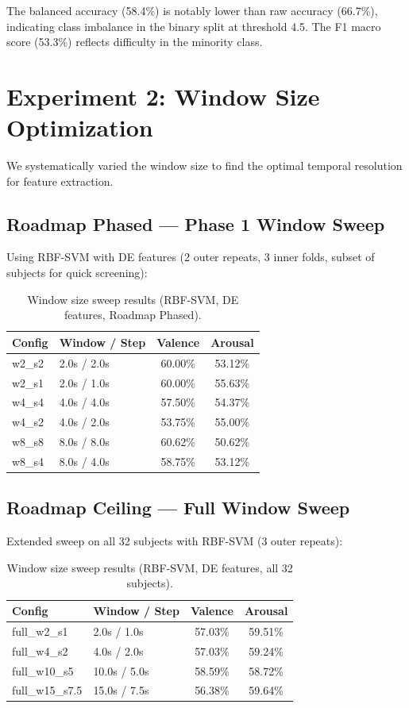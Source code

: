 \documentclass[12pt,a4paper]{report}
\begin{document}
The balanced accuracy (58.4\%) is notably lower than raw accuracy (66.7\%),
indicating class imbalance in the binary split at threshold 4.5. The F1
macro score (53.3\%) reflects difficulty in the minority class.


\section{Experiment 2: Window Size Optimization}
\label{sec:exp_window}

We systematically varied the window size to find the optimal temporal
resolution for feature extraction.

\subsection{Roadmap Phased --- Phase 1 Window Sweep}

Using RBF-SVM with DE features (2 outer repeats, 3 inner folds, subset of
subjects for quick screening):

\begin{table}[H]
\centering
\caption{Window size sweep results (RBF-SVM, DE features, Roadmap Phased).}
\label{tab:window_sweep_phased}
\begin{tabular}{llcc}
\toprule
\textbf{Config} & \textbf{Window / Step} & \textbf{Valence} & \textbf{Arousal} \\
\midrule
w2\_s2 & 2.0s / 2.0s & 60.00\% & 53.12\% \\
w2\_s1 & 2.0s / 1.0s & 60.00\% & 55.63\% \\
w4\_s4 & 4.0s / 4.0s & 57.50\% & 54.37\% \\
w4\_s2 & 4.0s / 2.0s & 53.75\% & 55.00\% \\
w8\_s8 & 8.0s / 8.0s & 60.62\% & 50.62\% \\
w8\_s4 & 8.0s / 4.0s & 58.75\% & 53.12\% \\
\bottomrule
\end{tabular}
\end{table}

\subsection{Roadmap Ceiling --- Full Window Sweep}

Extended sweep on all 32 subjects with RBF-SVM (3 outer repeats):

\begin{table}[H]
\centering
\caption{Window size sweep results (RBF-SVM, DE features, all 32 subjects).}
\label{tab:window_sweep_full}
\begin{tabular}{llcc}
\toprule
\textbf{Config} & \textbf{Window / Step} & \textbf{Valence} & \textbf{Arousal} \\
\midrule
full\_w2\_s1  & 2.0s / 1.0s  & 57.03\% & 59.51\% \\
full\_w4\_s2  & 4.0s / 2.0s  & 57.03\% & 59.24\% \\
full\_w10\_s5 & 10.0s / 5.0s & 58.59\% & 58.72\% \\
full\_w15\_s7.5 & 15.0s / 7.5s & 56.38\% & 59.64\% \\
\bottomrule
\end{tabular}
\end{table}
\end{document}
